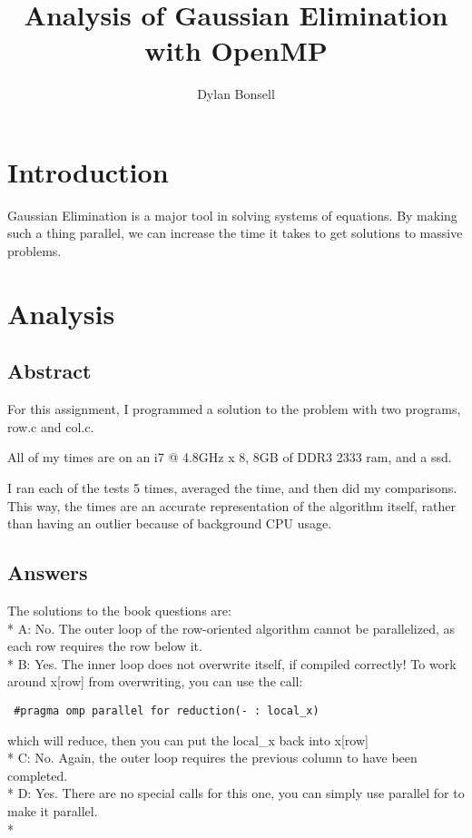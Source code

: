 \documentclass[dvips]{article}
\begin{document}
\title{Analysis of Gaussian Elimination with OpenMP}
 
\author{Dylan Bonsell}
 
\maketitle %
 
\section{Introduction}

Gaussian Elimination is a major tool in solving systems of equations. By making such a thing parallel, we can increase the time it takes to get solutions to massive problems.

\section{Analysis}
 
\subsection{Abstract}

For this assignment, I programmed a solution to the problem with two programs, row.c and col.c.

All of my times are on an i7 @ 4.8GHz x 8, 8GB of DDR3 2333 ram, and a ssd.

I ran each of the tests 5 times, averaged the time, and then did my comparisons. This way, the times are an accurate representation of the algorithm itself,
rather than having an outlier because of background CPU usage. 

\subsection{Answers}

The solutions to the book questions are:
\\*
A: No. The outer loop of the row-oriented algorithm cannot be parallelized, as each row requires the row
below it.
\\*
B: Yes. The inner loop does not overwrite itself, if compiled correctly!
To work around x[row] from overwriting, you can use the call:
 \begin{verbatim}
 #pragma omp parallel for reduction(- : local_x)
 \end{verbatim}
which will reduce, then you can put the local\_x back into x[row]
\\*
C: No. Again, the outer loop requires the previous column to have been completed.
\\*
D: Yes. There are no special calls for this one, you can simply use parallel for to make it parallel.
\\*
\end{document}
